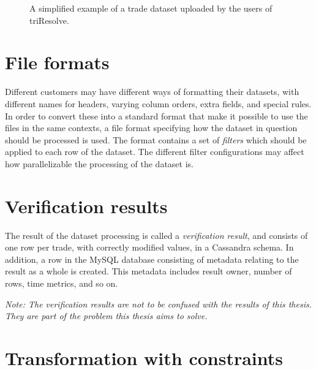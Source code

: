\begin{figure}[ht]
\centering
{}
\caption[Example of trade dataset]{A simplified example of a trade dataset uploaded by the users of triResolve.}
  \label{fig:data_set_example}
\end{figure}

\section{File formats}
Different customers may have different ways of formatting their datasets, with different names for headers, varying column orders, extra fields,
and special rules. In order to convert these into a standard format that make it possible to use the files in the same contexts, a file format specifying
how the dataset in question should be processed is used. The format contains a set of \textit{filters} which should be applied to each row of the dataset.
The different filter configurations may affect how parallelizable the processing of the dataset is.

\section{Verification results}
The result of the dataset processing is called a \textit{verification result}, and consists of one row per trade, with correctly modified values, in a Cassandra schema.
In addition, a row in the MySQL database consisting of metadata relating to the result as a whole is created. This metadata includes result owner, number of rows, time metrics, and so on.

\textit{Note: The verification results are not to be confused with the results of this thesis. They are part of the problem this thesis aims to solve.}

\section{Transformation with constraints}

